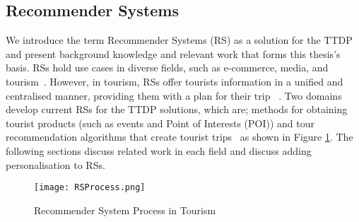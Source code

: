 \subsection{Recommender Systems} 

We introduce the term Recommender Systems (RS) as a solution for the TTDP and
present background knowledge and relevant work that forms this thesis's basis.
RSs hold use cases in diverse fields, such as e-commerce, media, and
tourism~\cite{Herzog2020}. However, in tourism, RSs offer tourists information
in a unified and centralised manner, providing them with a plan for their trip
~\cite{Santamaria-Granados2020, DiBitonto2010a, Lim2018}.  Two domains develop
current RSs for the TTDP solutions, which are; methods for obtaining tourist
products (such as events and Point of Interests (POI)) and tour recommendation
algorithms that create tourist trips~\cite{Lim2018} as shown in Figure \ref{RS}.  The following sections
discuss related work in each field and discuss adding personalisation to RSs.

\begin{figure}[h]
\centering
\texttt{[image: RSProcess.png]}
\caption{Recommender System Process in Tourism}
\label{RS}
\end{figure}





